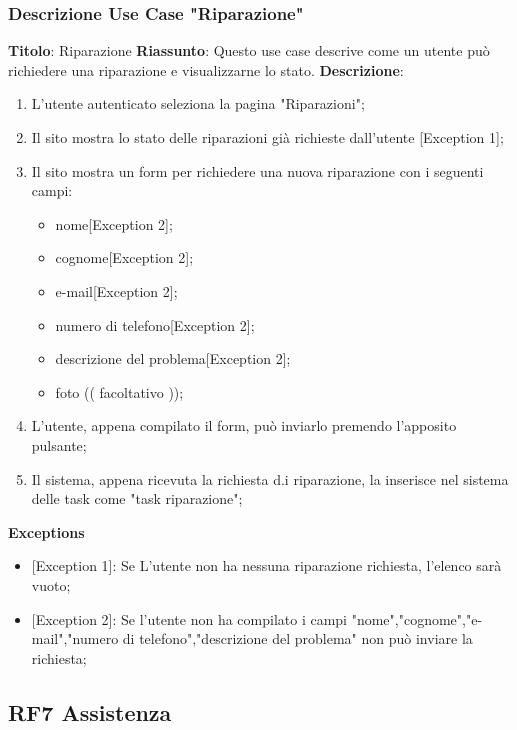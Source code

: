 \documentclass{report}
\begin{document}
\subsubsection*{Descrizione Use Case "Riparazione"}
\textbf{Titolo}: Riparazione \newline
\textbf{Riassunto}: Questo use case descrive come un utente può richiedere una riparazione e visualizzarne lo stato. \newline
\textbf{Descrizione}:
	\begin{enumerate}
		\item L'utente autenticato seleziona la pagina "Riparazioni";
		\item Il sito mostra lo stato delle riparazioni già richieste dall'utente [Exception 1];
		\item Il sito mostra un form per richiedere una nuova riparazione con i seguenti campi:
		\begin{itemize}
			\item nome[Exception 2];
			\item cognome[Exception 2]; 
			\item e-mail[Exception 2];
			\item numero di telefono[Exception 2];
			\item descrizione del problema[Exception 2];
			\item foto (( facoltativo ));
		\end{itemize}
		\item L'utente, appena compilato il form, può inviarlo premendo l'apposito pulsante;
		\item Il sistema, appena ricevuta la richiesta d.i riparazione, la inserisce nel sistema delle task come "task riparazione";
		
	\end{enumerate}
\textbf{Exceptions}
\begin{itemize}
	\item {[Exception 1]}: Se L'utente non ha nessuna riparazione richiesta, l'elenco sarà vuoto;
	\item {[Exception 2]}: Se l'utente non ha compilato i campi "nome","cognome","e-mail","numero di telefono","descrizione del problema" non può inviare la richiesta;
\end{itemize}
\subsection*{RF7 Assistenza}
\end{document}
